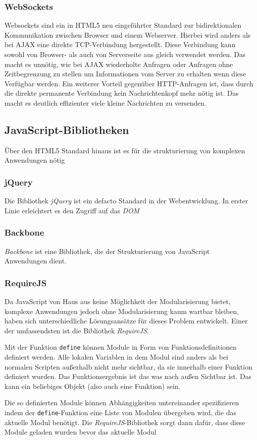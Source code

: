 \subsubsection{WebSockets}

Websockets sind ein in HTML5 neu eingeführter Standard zur bidirektionalen 
Kommunikation zwischen Browser und einem Webserver. Hierbei wird anders als bei 
AJAX eine direkte TCP-Verbindung hergestellt. Diese Verbindung kann sowohl von 
Browser- als auch von Serverseite aus gleich verwendet werden. Das macht es 
unnötig, wie bei AJAX wiederholte Anfragen oder Anfragen ohne Zeitbegrenzung zu 
stellen um Informationen vom Server zu erhalten wenn diese Verfügbar werden. Ein
weiterer Vorteil gegenüber HTTP-Anfragen ist, dass durch die direkte permanente
Verbindung kein Nachrichtenkopf mehr nötig ist. Das macht es deutlich 
effizienter viele kleine Nachrichten zu versenden.

\subsection{JavaScript-Bibliotheken}

Über den HTML5 Standard hinaus ist es für die strukturierung von komplexen 
Anwendungen nötig 

\subsubsection{jQuery}

Die Bibliothek \textit{jQuery} ist ein defacto Standard in der Webentwicklung. 
In erster Linie erleichtert es den Zugriff auf das \textit{DOM}

\subsubsection{Backbone}

\textit{Backbone} ist eine Bibliothek, die der Strukturierung von JavaScript
Anwendungen dient.

\subsubsection{RequireJS}

Da JavaScript von Haus aus keine Möglichkeit der Modularisierung bietet, 
komplexe Anwendungen jedoch ohne Modularisierung kaum wartbar bleiben, haben 
sich unterschiedliche Lösungsansätze für dieses Problem entwickelt. Einer der 
umfassendsten ist die Bibliothek \textit{RequireJS}.

Mit der Funktion \texttt{define} können Module in Form von Funktionsdefinitionen 
definiert werden. Alle lokalen Variablen in dem Modul sind anders als bei 
normalen Scripten außerhalb nicht mehr sichtbar, da sie innerhalb einer 
Funktion definiert wurden. Das Funktionsergebnis ist das was nach außen Sichtbar 
ist. Das kann ein beliebiges Objekt (also auch eine Funktion) sein.

Die so definierten Module können Abhängigkeiten untereinander spezifizieren 
indem der \texttt{define}-Funktion eine Liste von Modulen übergeben wird, die 
das aktuelle Modul benötigt. Die \textit{RequireJS}-Bibliothek sorgt dann dafür, 
dass diese Module geladen wurden bevor das aktuelle Modul